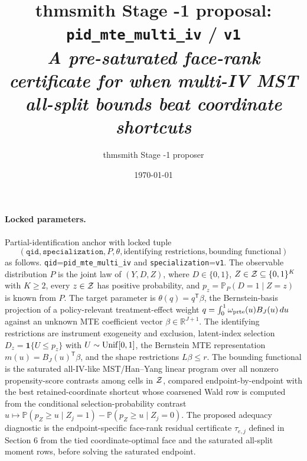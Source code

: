\documentclass[11pt]{article}
\title{thmsmith Stage -1 proposal: \texttt{pid\_mte\_multi\_iv} / \texttt{v1}%
  \\ \large\textit{A pre-saturated face-rank certificate for when multi-IV MST all-split bounds beat coordinate shortcuts}}
\author{thmsmith Stage -1 proposer}
\date{\today}
\renewcommand{\Pr}{\mathbb{P}}
\newcommand{\one}{\mathbf{1}}
\newcommand{\transpose}{\mathsf{T}}
\newcommand{\R}{\mathbb{R}}
\theoremstyle{definition}
\theoremstyle{plain}
\theoremstyle{remark}
\begin{document}
\maketitle


\paragraph{Locked parameters.}
Partial-identification anchor with locked tuple
\[
(\texttt{qid},\texttt{specialization},P,\theta,\text{identifying restrictions},
\text{bounding functional})
\]
as follows.  \texttt{qid}=\texttt{pid\_mte\_multi\_iv} and
\texttt{specialization}=\texttt{v1}.  The observable distribution \(P\) is the
joint law of \((Y,D,Z)\), where \(D\in\{0,1\}\), \(Z\in{\cal Z}\subseteq
\{0,1\}^K\) with \(K\ge 2\), every \(z\in{\cal Z}\) has positive probability,
and \(p_z=\Pr_P(D=1\mid Z=z)\) is known from \(P\).  The target parameter is
\(\theta(q)=q^\transpose\beta\), the Bernstein-basis projection of a
policy-relevant treatment-effect weight \(q=\int_0^1\omega_{\rm prte}(u)
B_J(u)\,du\) against an unknown MTE coefficient vector \(\beta\in\R^{J+1}\).
The identifying restrictions are instrument exogeneity and exclusion,
latent-index selection \(D_z=\one\{U\le p_z\}\) with \(U\sim{\rm Unif}[0,1]\),
the Bernstein MTE representation \(m(u)=B_J(u)^\transpose\beta\), and the
shape restrictions \(L\beta\le r\).  The bounding functional is the saturated
all-IV-like MST/Han--Yang linear program over all nonzero propensity-score
contrasts among cells in \({\cal Z}\), compared endpoint-by-endpoint with the
best retained-coordinate shortcut whose coarsened Wald row is computed from
the conditional
selection-probability contrast \(u\mapsto
\Pr(p_Z\ge u\mid Z_j=1)-\Pr(p_Z\ge u\mid Z_j=0)\).  The proposed
adequacy diagnostic is the endpoint-specific face-rank residual certificate
\(\tau_{e,j}\) defined in Section 6 from the tied coordinate-optimal face and
the saturated all-split moment rows, before solving the saturated endpoint.
\end{document}
